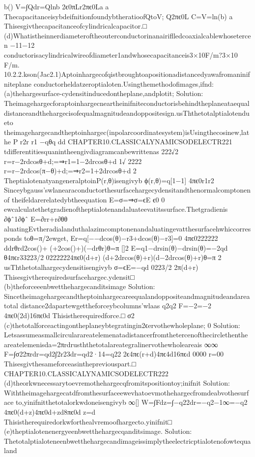 {{{{{{{{{{{b()
V=∫Qdr=Qlnb
2ϵ0πLr2πϵ0La
a
ThecapacitanceisybdeifnitionfoundybtheratioofQtoV;
Q2πϵ0L
C=V=ln(b)
a
Thisesgivthecapacitanceofcylindricalcapacitor.□
(d)Whatistheinnerdiameteroftheouterconductorinanairiflledcoaxialcablewhosetercen
−11−12
conductorisacylindricalwireofdiameter1andwhosecapacitanceis3×10F/m?3×10
F/m.
10.2.2.kson(Jac2.1)Aptoinhargecofqistbroughtoapositionadistancedyawafromaninifniteplane
conductorheldatzeroptialoten.Usingthemethodofimages,ifnd:
(a)thehargesurface-cydensitinducedontheplane,andplotit;
Solution:
Theimagehargecforaptoinhargecneartheinifniteconductorisbehindtheplaneataequal
distanceandthehargecisofequalmagnitudeandoppositesign.usThthetotalptialotendueto
theimagehargecandtheptoinhargec(inpolarcoordinatesystem)isUsingthecosinew,lathe
P
r2r
r1
−qθq
dd
CHAPTER10.CLASSICALYNAMICSODELECTR221
tdifferentitiesquanintheengivdiagramcanbewrittenas
222√2
r=r−2rdcosθ+d;=⇒r1=1−2drcosθ+d
1√
2222
r=r−2rdcos(π−θ)+d;=⇒r2=1+2drcosθ+d
2
TheptialotenatyangeneralptoinP(r,θ)isengivyb
ϕ(r,θ)=q[1−1]
4πϵ0r1r2
Sinceybgauss’swlanearaconductorthesurfacehargecydensitandthenormalcomptonenof
theifeldarerelatedybtheequation
E=σ=⇒σ=ϵE
ϵ0
0
ewcalculatethetgradienoftheptialotenandaluateevatitssurface.Thetgradienis
∂ϕˆ1∂ϕˆ
E=∂rr+r∂θθ
aluatingEvtheradialanduthalazimcomptonenandaluatingevatthesurfacehwhiccorresponds
toθ=π/2ewget,
Er=q[−−dcos(θ)−r3+dcos(θ)−r3]=0
4πϵ0222222
ddrθrd2cos()+
(+2cos()+)(−drθr)θ=π
[]2
E=q1−drsin(θ)−drsin(θ)=−2qd
θ4πϵr33223/2
02222224πϵ0(d+r)
(d+2drcos(θ)+r)(d−2drcos(θ)+r)θ=π
2
usThthetotalhargecydensitisengivyb
σ=ϵE=−qd
0223/2
2π(d+r)
Thisesgivtherequiredsurfacehargec.ydensit□
(b)theforceeenbwetthehargecanditsimage
Solution:
Sincetheimagehargecandtheptoinhargecareequalandoppositeandmagnitudeandareatotal
distance2dapartewgettheforceybcolumns’wlaas
q2q2
F=−2=−2
4πϵ0(2d)16πϵ0d
Thisistherequiredforce.□
σ2
(c)thetotalforceactingontheplaneybtegratingin2ϵervothewholeplane;
0
Solution:
Letsassumeasmallcircularareatelemenatadistancerfromthetercenofthecirclethenthe
areatelemenisda=2πrdrusththetotalareategralinervothewholeareais
∞∞
F=∫σ22πrdr=qd2∫2r23dr=qd2·14=q22
2ϵ4πϵ(r+d)4πϵ4d16πϵd
0000
r=00
Thisesgivthesameforceasinthepreviouspart.□
CHAPTER10.CLASSICALYNAMICSODELECTR222
(d)theorkwnecessarytoevremothehargecqfromitspositiontoy;inifnit
Solution:
Withtheimagehargecatdfromthesurfaceewevhatoevmothehargecfromdeabvothesurface
to,yinifnitthetotalorkwdoneisengivyb
∞[]
W=∫Fdz=∫−q22dr=−q2−1∞=−q2
4πϵ0(d+z)4πϵ0d+zd8πϵ0d
z=d
Thisistherequiredorkwforthealvremoofhargecto.yinifnit□
(e)theptialotenenergyeenbwetthehargecqanditsimage.
Solution:
Thetotalptialoteneenbwetthehargecandimageissimplytheelectricptialotenofowtequaland
}}}}}}}}}}}
